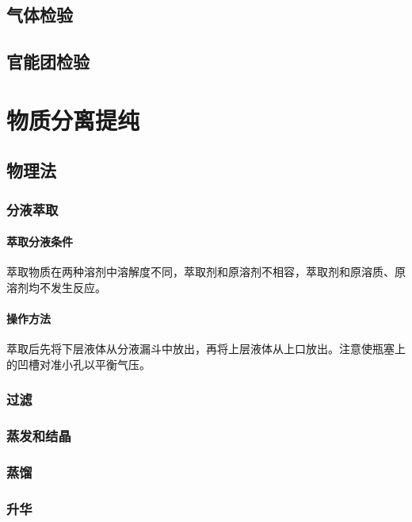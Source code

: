 \documentclass[a4paper]{article}
\begin{document}
	
	\subsection{气体检验}
	
	\subsection{官能团检验}
	
	
	\clearpage
	\section{物质分离提纯}
	
	
	\subsection{物理法}
	
	\subsubsection{分液萃取}
	\paragraph{萃取分液条件}
	萃取物质在两种溶剂中溶解度不同，萃取剂和原溶剂不相容，萃取剂和原溶质、原溶剂均不发生反应。
	\paragraph{操作方法}
	萃取后先将下层液体从分液漏斗中放出，再将上层液体从上口放出。注意使瓶塞上的凹槽对准小孔以平衡气压。
	
	\subsubsection{过滤}
	
	\subsubsection{蒸发和结晶}
	
	\subsubsection{蒸馏}
	
	\subsubsection{升华}
	
\end{document}
